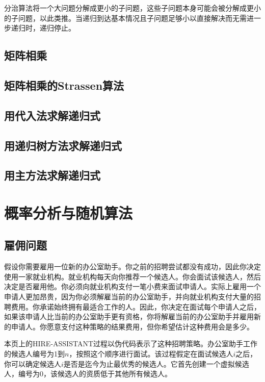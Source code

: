 \documentclass[lang=cn,newtx,10pt,scheme=chinese]{elegantbook}
\begin{document}
分治算法将一个大问题分解成更小的子问题，这些子问题本身可能会被分解成更小的子问题，以此类推。当递归到达基本情况且子问题足够小以直接解决而无需进一步递归时，递归停止。

\section{矩阵相乘}

\section{矩阵相乘的Strassen算法}

\section{用代入法求解递归式}

\section{用递归树方法求解递归式}

\section{用主方法求解递归式}

\chapter{概率分析与随机算法}

\section{雇佣问题}

假设你需要雇用一位新的办公室助手。你之前的招聘尝试都没有成功，因此你决定使用一家就业机构。就业机构每天向你推荐一个候选人。你会面试该候选人，然后决定是否雇用他。你必须向就业机构支付一笔小费来面试申请人。实际上雇用一个申请人更加昂贵，因为你必须解雇当前的办公室助手，并向就业机构支付大量的招聘费用。你承诺始终拥有最适合工作的人。因此，你决定在面试每个申请人之后，如果该申请人比当前的办公室助手更有资格，你将解雇当前的办公室助手并雇用新的申请人。你愿意支付这种策略的结果费用，但你希望估计这种费用会是多少。

本页上的HIRE-ASSISTANT过程以伪代码表示了这种招聘策略。办公室助手工作的候选人编号为1到$n$，按照这个顺序进行面试。该过程假定在面试候选人$i$之后，你可以确定候选人$i$是否是迄今为止最优秀的候选人。它首先创建一个虚拟候选人，编号为0，该候选人的资质低于其他所有候选人。
\end{document}
